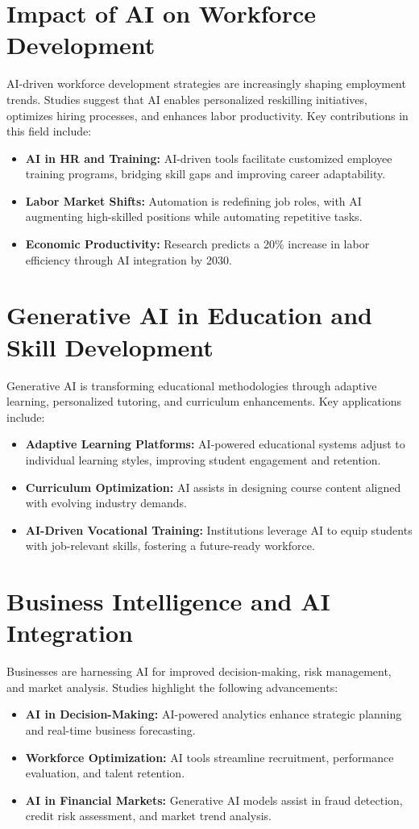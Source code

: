 \documentclass[a4paper,headinclude=on,footinclude=on,12pt,oneside]{scrbook}
\begin{document}
\section*{Impact of AI on Workforce Development}

AI-driven workforce development strategies are increasingly shaping employment trends. Studies suggest that AI enables personalized reskilling initiatives, optimizes hiring processes, and enhances labor productivity. Key contributions in this field include:
\begin{itemize}
	\item \textbf{AI in HR and Training:} AI-driven tools facilitate customized employee training programs, bridging skill gaps and improving career adaptability.
	\item \textbf{Labor Market Shifts:} Automation is redefining job roles, with AI augmenting high-skilled positions while automating repetitive tasks.
	\item \textbf{Economic Productivity:} Research predicts a 20\% increase in labor efficiency through AI integration by 2030.
\end{itemize}

\section*{Generative AI in Education and Skill Development}

Generative AI is transforming educational methodologies through adaptive learning, personalized tutoring, and curriculum enhancements. Key applications include:
\begin{itemize}
	\item \textbf{Adaptive Learning Platforms:} AI-powered educational systems adjust to individual learning styles, improving student engagement and retention.
	\item \textbf{Curriculum Optimization:} AI assists in designing course content aligned with evolving industry demands.
	\item \textbf{AI-Driven Vocational Training:} Institutions leverage AI to equip students with job-relevant skills, fostering a future-ready workforce.
\end{itemize}

\section*{Business Intelligence and AI Integration}

Businesses are harnessing AI for improved decision-making, risk management, and market analysis. Studies highlight the following advancements:
\begin{itemize}
	\item \textbf{AI in Decision-Making:} AI-powered analytics enhance strategic planning and real-time business forecasting.
	\item \textbf{Workforce Optimization:} AI tools streamline recruitment, performance evaluation, and talent retention.
	\item \textbf{AI in Financial Markets:} Generative AI models assist in fraud detection, credit risk assessment, and market trend analysis.
\end{itemize}
\end{document}
